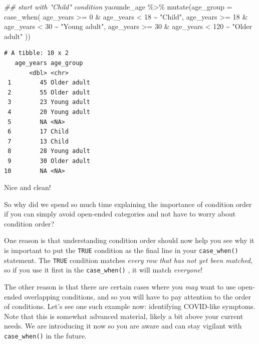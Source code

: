 \documentclass[
  letterpaper,
  DIV=11,
  numbers=noendperiod]{scrreprt}
\newenvironment{Shaded}{\begin{snugshade}}{\end{snugshade}}
\newcommand{\AttributeTok}[1]{\textcolor[rgb]{0.40,0.45,0.13}{#1}}
\newcommand{\DecValTok}[1]{\textcolor[rgb]{0.68,0.00,0.00}{#1}}
\newcommand{\DocumentationTok}[1]{\textcolor[rgb]{0.37,0.37,0.37}{\textit{#1}}}
\newcommand{\FunctionTok}[1]{\textcolor[rgb]{0.28,0.35,0.67}{#1}}
\newcommand{\NormalTok}[1]{\textcolor[rgb]{0.00,0.23,0.31}{#1}}
\newcommand{\SpecialCharTok}[1]{\textcolor[rgb]{0.37,0.37,0.37}{#1}}
\newcommand{\StringTok}[1]{\textcolor[rgb]{0.13,0.47,0.30}{#1}}
\begin{document}
\begin{Shaded}
\begin{Highlighting}[]
\DocumentationTok{\#\# start with "Child" condition}
\NormalTok{yaounde\_age }\SpecialCharTok{\%\textgreater{}\%}
  \FunctionTok{mutate}\NormalTok{(}\AttributeTok{age\_group =} \FunctionTok{case\_when}\NormalTok{(}
\NormalTok{    age\_years }\SpecialCharTok{\textgreater{}=} \DecValTok{0} \SpecialCharTok{\&}\NormalTok{ age\_years }\SpecialCharTok{\textless{}} \DecValTok{18} \SpecialCharTok{\textasciitilde{}} \StringTok{"Child"}\NormalTok{,}
\NormalTok{    age\_years }\SpecialCharTok{\textgreater{}=} \DecValTok{18} \SpecialCharTok{\&}\NormalTok{ age\_years }\SpecialCharTok{\textless{}} \DecValTok{30} \SpecialCharTok{\textasciitilde{}} \StringTok{"Young adult"}\NormalTok{,}
\NormalTok{    age\_years }\SpecialCharTok{\textgreater{}=} \DecValTok{30} \SpecialCharTok{\&}\NormalTok{ age\_years }\SpecialCharTok{\textless{}} \DecValTok{120} \SpecialCharTok{\textasciitilde{}} \StringTok{"Older adult"}
\NormalTok{  ))}
\end{Highlighting}
\end{Shaded}

\begin{verbatim}
# A tibble: 10 x 2
   age_years age_group  
       <dbl> <chr>      
 1        45 Older adult
 2        55 Older adult
 3        23 Young adult
 4        20 Young adult
 5        NA <NA>       
 6        17 Child      
 7        13 Child      
 8        28 Young adult
 9        30 Older adult
10        NA <NA>       
\end{verbatim}

Nice and clean!

So why did we spend so much time explaining the importance of condition
order if you can simply avoid open-ended categories and not have to
worry about condition order?

One reason is that understanding condition order should now help you see
why it is important to put the \texttt{TRUE} condition as the final line
in your \texttt{case\_when()} statement. The \texttt{TRUE} condition
matches \emph{every row that has not yet been matched}, so if you use it
first in the \texttt{case\_when()} , it will match \emph{everyone}!

The other reason is that there are certain cases where you \emph{may}
want to use open-ended overlapping conditions, and so you will have to
pay attention to the order of conditions. Let's see one such example
now: identifying COVID-like symptoms. Note that this is somewhat
advanced material, likely a bit above your current needs. We are
introducing it now so you are aware and can stay vigilant with
\texttt{case\_when()} in the future.
\end{document}
